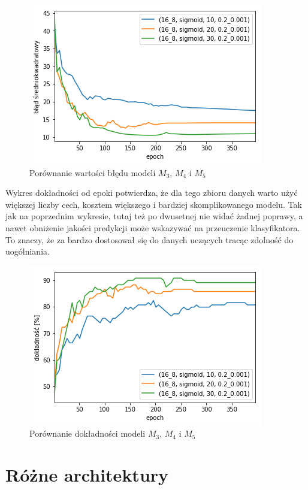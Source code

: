 \documentclass{report}
\begin{document}
    \begin{figure}[htp]
        \centering
        \includegraphics[scale=0.8]{./img/feat-error.png}
        \caption{Porównanie wartości błędu modeli $M_3$, $M_4$ i $M_5$}
    \end{figure}

    Wykres dokładności od epoki potwierdza, że dla tego zbioru danych warto użyć większej liczby cech, kosztem większego i bardziej skomplikowanego modelu.
    Tak jak na poprzednim wykresie, tutaj też po dwusetnej nie widać żadnej poprawy, a nawet obniżenie jakości predykcji może wskazywać na przeuczenie klasyfikatora.
    To znaczy, że za bardzo dostosował się do danych uczących tracąc zdolność do uogólniania.

    \begin{figure}[htp]
        \centering
        \includegraphics[scale=0.8]{././img/feat-accuracy.png}
        \caption{Porównanie dokładności modeli $M_3$, $M_4$ i $M_5$}
    \end{figure}

    \section{Różne architektury}\label{sec:różneArchitektury}
\end{document}
